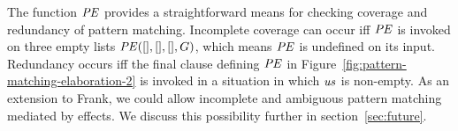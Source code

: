 \documentclass[11pt]{article}
\begin{document}
The function $\mathit{PE}$ provides a straightforward means for checking
coverage and redundancy of pattern matching. Incomplete coverage can
occur iff $\mathit{PE}$ is invoked on three empty lists $\mathit{PE}([],
[], [], G)$, which means $\mathit{PE}$ is undefined on its
input. Redundancy occurs iff the final clause defining $\mathit{PE}$ in
Figure~\ref{fig:pattern-matching-elaboration-2} is invoked in a
situation in which $\mathit{us}$ is non-empty.
%
As an extension to Frank, we could allow incomplete and ambiguous
pattern matching mediated by effects.
We discuss this possibility further in
section~\ref{sec:future}.

\end{document}
